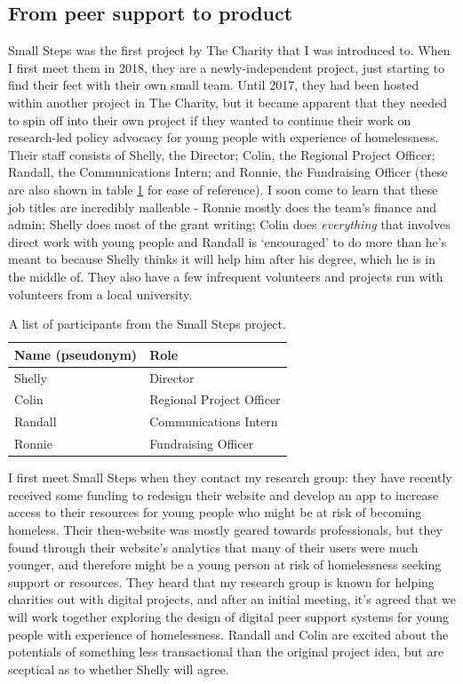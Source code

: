 \subsection{From peer support to product}
Small Steps was the first project by The Charity that I was introduced to. When I first meet them in 2018, they are a newly-independent project, just starting to find their feet with their own small team. Until 2017, they had been hosted within another project in The Charity, but it became apparent that they needed to spin off into their own project if they wanted to continue their work on research-led policy advocacy for young people with experience of homelessness. Their staff consists of Shelly, the Director; Colin, the Regional Project Officer; Randall, the Communications Intern; and Ronnie, the Fundraising Officer (these are also shown in table \ref{tab:small-steps-participants} for ease of reference). I soon come to learn that these job titles are incredibly malleable - Ronnie mostly does the team's finance and admin; Shelly does most of the grant writing; Colin does \textit{everything} that involves direct work with young people and Randall is `encouraged' to do more than he's meant to because Shelly thinks it will help him after his degree, which he is in the middle of. They also have a few infrequent volunteers and projects run with volunteers from a local university. 
\begin{table}[h!]
\centering
\begin{tabular}{|l|l|} \hline 
\textbf{Name (pseudonym)} & \textbf{Role}                    \\ \hline 
Shelly& Director\\ \hline 
Colin& Regional Project Officer\\ \hline 
Randall& Communications Intern\\ \hline 
Ronnie& Fundraising Officer\\\hline\end{tabular}

\caption{A list of participants from the Small Steps project.}
\label{tab:small-steps-participants}
\end{table}

I first meet Small Steps when they contact my research group: they have recently received some funding to redesign their website and develop an app to increase access to their resources for young people who might be at risk of becoming homeless. Their then-website was mostly geared towards professionals, but they found through their website's analytics that many of their users were much younger, and therefore might be a young person at risk of homelessness seeking support or resources. They heard that my research group is known for helping charities out with digital projects, and after an initial meeting, it's agreed that we will work together exploring the design of digital peer support systems for young people with experience of homelessness. Randall and Colin are excited about the potentials of something less transactional than the original project idea, but are sceptical as to whether Shelly will agree. 

